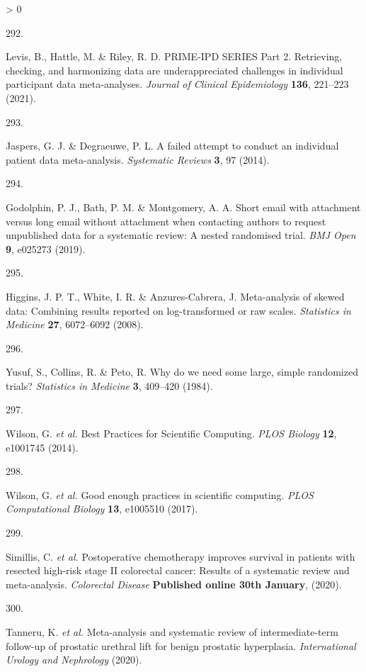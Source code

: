 \documentclass[a4paper, twoside]{templates/ociamthesis}
\newlength{\cslhangindent}
\newlength{\csllabelwidth}
\newenvironment{CSLReferences}[3] %
 {%
  \setlength{\parindent}{0pt}
  \ifodd #1 \everypar{\setlength{\hangindent}{\cslhangindent}}\ignorespaces\fi
  \ifnum #2 > 0
  \setlength{\parskip}{#2\baselineskip}
  \fi
 }%
 {}
\newcommand{\CSLLeftMargin}[1]{\parbox[t]{\maxof{\widthof{#1}}{\csllabelwidth}}{#1}}
\newcommand{\CSLRightInline}[1]{\parbox[t]{\linewidth - \csllabelwidth}{#1}}
\begin{document}
\begin{CSLReferences}{0}{0}
\leavevmode\hypertarget{ref-levis2021}{}%
\CSLLeftMargin{292. }
\CSLRightInline{Levis, B., Hattle, M. \& Riley, R. D. {PRIME}-{IPD SERIES Part} 2. {Retrieving}, checking, and harmonizing data are underappreciated challenges in individual participant data meta-analyses. \emph{Journal of Clinical Epidemiology} \textbf{136}, 221--223 (2021).}

\leavevmode\hypertarget{ref-jaspers2014}{}%
\CSLLeftMargin{293. }
\CSLRightInline{Jaspers, G. J. \& Degraeuwe, P. L. A failed attempt to conduct an individual patient data meta-analysis. \emph{Systematic Reviews} \textbf{3}, 97 (2014).}

\leavevmode\hypertarget{ref-godolphin2019a}{}%
\CSLLeftMargin{294. }
\CSLRightInline{Godolphin, P. J., Bath, P. M. \& Montgomery, A. A. Short email with attachment versus long email without attachment when contacting authors to request unpublished data for a systematic review: A nested randomised trial. \emph{BMJ Open} \textbf{9}, e025273 (2019).}

\leavevmode\hypertarget{ref-higgins2008a}{}%
\CSLLeftMargin{295. }
\CSLRightInline{Higgins, J. P. T., White, I. R. \& Anzures-Cabrera, J. Meta-analysis of skewed data: {Combining} results reported on log-transformed or raw scales. \emph{Statistics in Medicine} \textbf{27}, 6072--6092 (2008).}

\leavevmode\hypertarget{ref-yusuf1984}{}%
\CSLLeftMargin{296. }
\CSLRightInline{Yusuf, S., Collins, R. \& Peto, R. Why do we need some large, simple randomized trials? \emph{Statistics in Medicine} \textbf{3}, 409--420 (1984).}

\leavevmode\hypertarget{ref-wilson2014}{}%
\CSLLeftMargin{297. }
\CSLRightInline{Wilson, G. \emph{et al.} Best {Practices} for {Scientific Computing}. \emph{PLOS Biology} \textbf{12}, e1001745 (2014).}

\leavevmode\hypertarget{ref-wilson2017}{}%
\CSLLeftMargin{298. }
\CSLRightInline{Wilson, G. \emph{et al.} Good enough practices in scientific computing. \emph{PLOS Computational Biology} \textbf{13}, e1005510 (2017).}

\leavevmode\hypertarget{ref-simillis2020}{}%
\CSLLeftMargin{299. }
\CSLRightInline{Simillis, C. \emph{et al.} Postoperative chemotherapy improves survival in patients with resected high-risk stage {II} colorectal cancer: Results of a systematic review and meta-analysis. \emph{Colorectal Disease} \textbf{Published online 30th January}, (2020).}

\leavevmode\hypertarget{ref-tanneru2020}{}%
\CSLLeftMargin{300. }
\CSLRightInline{Tanneru, K. \emph{et al.} Meta-analysis and systematic review of intermediate-term follow-up of prostatic urethral lift for benign prostatic hyperplasia. \emph{International Urology and Nephrology} (2020).}

\end{CSLReferences}
\end{document}
